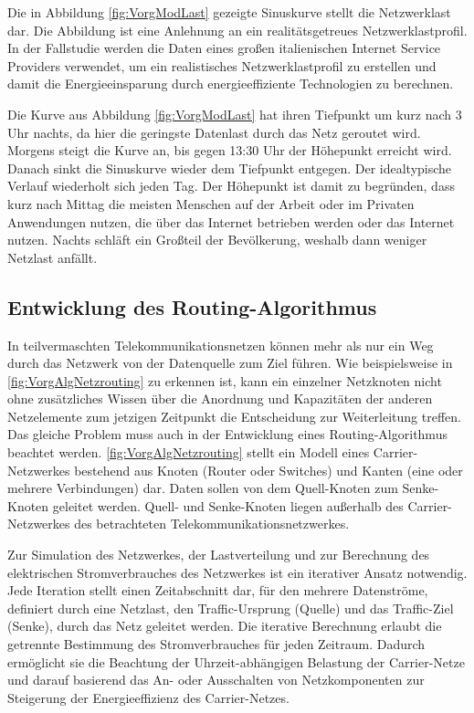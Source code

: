 Die in Abbildung \ref{fig:VorgModLast} gezeigte Sinuskurve stellt die Netzwerklast dar. Die Abbildung ist eine Anlehnung an ein realitätsgetreues Netzwerklastprofil. In der Fallstudie \cite[1]{Chiaraviglio2009} werden die Daten eines großen italienischen Internet Service Providers verwendet, um ein realistisches Netzwerklastprofil zu erstellen und damit die Energieeinsparung durch energieeffiziente Technologien zu berechnen.

Die Kurve aus Abbildung \ref{fig:VorgModLast} hat ihren Tiefpunkt um kurz nach 3 Uhr nachts, da hier die geringste Datenlast durch das Netz geroutet wird. Morgens steigt die Kurve an, bis gegen 13:30 Uhr der Höhepunkt erreicht wird. Danach sinkt die Sinuskurve wieder dem Tiefpunkt entgegen. Der idealtypische Verlauf wiederholt sich jeden Tag. Der Höhepunkt ist damit zu begründen, dass kurz nach Mittag die meisten Menschen auf der Arbeit oder im Privaten Anwendungen nutzen, die über das Internet betrieben werden oder das Internet nutzen. Nachts schläft ein Großteil der Bevölkerung, weshalb dann weniger Netzlast anfällt. 

\subsection{Entwicklung des Routing-Algorithmus}\label{subsec:VorgAlg}
In teilvermaschten Telekommunikationsnetzen können mehr als nur ein Weg durch das Netzwerk von der Datenquelle zum Ziel führen. Wie beispielsweise in \ref{fig:VorgAlgNetzrouting} zu erkennen ist, kann ein einzelner Netzknoten nicht ohne zusätzliches Wissen über die Anordnung und Kapazitäten der anderen Netzelemente zum jetzigen Zeitpunkt die  Entscheidung zur Weiterleitung treffen. Das gleiche Problem muss auch in der Entwicklung eines Routing-Algorithmus beachtet werden. \ref{fig:VorgAlgNetzrouting} stellt ein Modell eines Carrier-Netzwerkes bestehend aus Knoten (Router oder Switches) und Kanten (eine oder mehrere Verbindungen) dar. Daten sollen von dem Quell-Knoten zum Senke-Knoten geleitet werden. Quell- und Senke-Knoten liegen außerhalb des Carrier-Netzwerkes des betrachteten Telekommunikationsnetzwerkes.

Zur Simulation des Netzwerkes, der Lastverteilung und zur Berechnung des elektrischen Stromverbrauches des Netzwerkes ist ein iterativer Ansatz notwendig. Jede Iteration stellt einen Zeitabschnitt dar, für den mehrere Datenströme, definiert durch eine Netzlast, den Traffic-Ursprung (Quelle) und das Traffic-Ziel (Senke), durch das Netz geleitet werden. Die iterative Berechnung erlaubt die getrennte Bestimmung des Stromverbrauches für jeden Zeitraum. Dadurch ermöglicht sie die Beachtung der Uhrzeit-abhängigen Belastung der Carrier-Netze und darauf basierend das An- oder Ausschalten von Netzkomponenten zur Steigerung der Energieeffizienz des Carrier-Netzes.  


